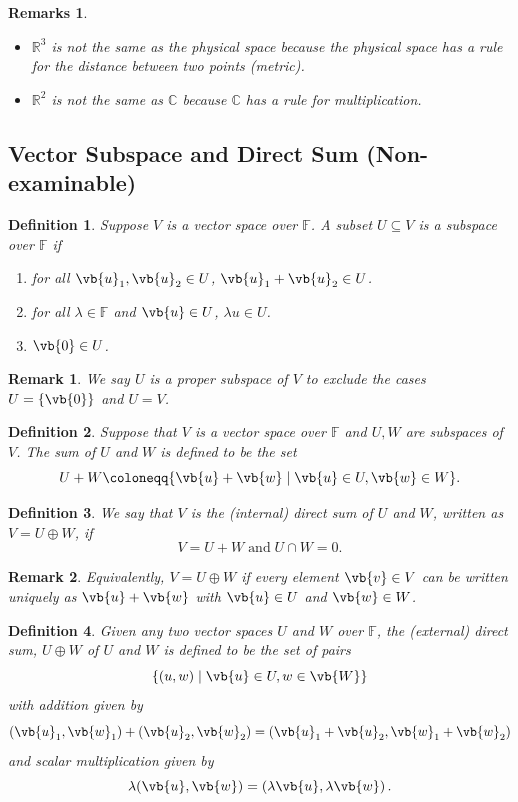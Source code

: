 \documentclass{article}
\theoremstyle{plain}\theoremheaderfont{\normalfont\itshape}\theorembodyfont{\rmfamily}\theoremseparator{.}\newtheorem*{rem}{Remark}\newtheorem*{ex}{Example}\newtheorem*{proof}{Proof}\newtheorem*{altp}{Alternative proof}
\theoremstyle{plain}\theoremheaderfont{\normalfont\bfseries}\theorembodyfont{\rmfamily}\theoremseparator{.}\newtheorem{thm}{Theorem}[section]\newtheorem{lem}[thm]{Lemma}\newtheorem{prop}[thm]{Proposition}\newtheorem*{cor}{Corollary}\newtheorem{defn}[thm]{Definition}\newtheorem{clm}[thm]{Claim}\newtheorem{clminproof}{Claim}
\theoremstyle{break}\theoremheaderfont{\normalfont\itshape}\theorembodyfont{\rmfamily}\theoremseparator{.\medskip}\newtheorem*{proofskip}{Proof}\newtheorem*{exs}{Examples}\newtheorem*{rems}{Remarks}
\theoremstyle{break}\theoremheaderfont{\normalfont\bfseries}\theorembodyfont{\rmfamily}\theoremseparator{.\medskip}\newtheorem{lemskip}[thm]{Lemma}\newtheorem{defnskip}[thm]{Definition}\newtheorem{propskip}[thm]{Proposition}\newtheorem{thmskip}[thm]{Theorem}
\numberwithin{equation}{section}
\begin{document}
	\begin{rems}
		\begin{itemize}[topsep=0pt]
			\item \(\mathbb{R}^3\) is not the same as the physical space because the physical space has a rule for the distance between two points (metric).
			\item \(\mathbb{R}^2\) is not the same as \(\mathbb{C}\) because \(\mathbb{C}\) has a rule for multiplication.
		\end{itemize}
	\end{rems}
	\subsection{Vector Subspace and Direct Sum (Non-examinable)}
	\begin{defn}
		Suppose \(V\) is a vector space over \(\mathbb{F}\). A subset \(U\subseteq V\) is a \textit{subspace} over \(\mathbb{F}\) if
		\begin{enumerate}[topsep=0pt]
			\item[(i)] for all \(\vb{u}_1,\vb{u}_2\in U\), \(\vb{u}_1+\vb{u}_2\in U\).
			\item[(ii)] for all \(\lambda\in\mathbb{F}\) and \(\vb{u}\in U\), \(\lambda u\in U\).
			\item[(iii)] \(\vb{0}\in U\).
		\end{enumerate}
	\end{defn}
	\begin{rem}
		We say \(U\) is a \textit{proper subspace} of \(V\) to exclude the cases \(U=\{\vb{0}\}\) and \(U=V\).
	\end{rem}
	\begin{defn}
		Suppose that \(V\) is a vector space over \(\mathbb{F}\) and \(U, W\) are subspaces of \(V\). The \textit{sum} of \(U\) and \(W\) is defined to be the set
		\[U+W\coloneqq\{\vb{u}+\vb{w} \mid \vb{u}\in U, \vb{w}\in W\}.\]
	\end{defn}
	\begin{defn}
		We say that \(V\) is the \textit{(internal) direct sum} of \(U\) and \(W\), written as \(V=U\oplus W\), if
		\[V=U+W\;\text{and}\; U \cap W=0.\]
	\end{defn}
	\begin{rem}
		Equivalently, \(V=U\oplus W\) if every element \(\vb{v}\in V\) can be written uniquely as \(\vb{u}+\vb{w}\) with \(\vb{u}\in U\) and \(\vb{w}\in W\).
	\end{rem}
	\begin{defn}
		Given any two vector spaces \(U\) and \(W\) over \(\mathbb{F}\), the \textit{(external) direct sum}, \(U \oplus W\) of \(U\) and \(W\) is defined to be the set of pairs
		\[\{(u, w) \mid \vb{u}\in U, w \in \vb{W}\}\]
		with addition given by
		\[(\vb{u}_1, \vb{w}_1) + (\vb{u}_2, \vb{w}_2) = (\vb{u}_1 + \vb{u}_2, \vb{w}_1 + \vb{w}_2)\]
		and scalar multiplication given by
		\[\lambda(\vb{u}, \vb{w}) = (\lambda\vb{u},\lambda\vb{w})\,.\]
	\end{defn}
\end{document}
